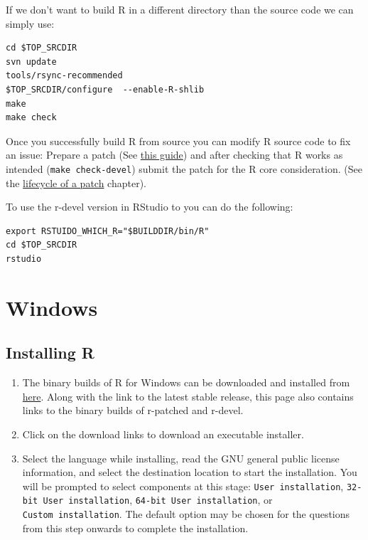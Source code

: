 \documentclass[
]{book}
\begin{document}
If we don't want to build R in a different directory than the source code we can simply use:

\begin{verbatim}
cd $TOP_SRCDIR 
svn update
tools/rsync-recommended
$TOP_SRCDIR/configure  --enable-R-shlib
make 
make check
\end{verbatim}

Once you successfully build R from source you can modify R source code to fix an issue: Prepare a patch (See \href{https://www.r-project.org/bugs.html\#how-to-submit-patches}{this guide}) and after checking that R works as intended (\texttt{make\ check-devel}) submit the patch for the R core consideration.
(See the \protect\hyperlink{FixBug}{lifecycle of a patch} chapter).

To use the r-devel version in RStudio to you can do the following:

\begin{verbatim}
export RSTUIDO_WHICH_R="$BUILDDIR/bin/R"
cd $TOP_SRCDIR
rstudio
\end{verbatim}

\hypertarget{windows-1}{%
\section{Windows}\label{windows-1}}

\hypertarget{installR}{%
\subsection{Installing R}\label{installR}}

\begin{enumerate}
\def\labelenumi{\arabic{enumi}.}
\item
  The binary builds of R for Windows can be downloaded and installed from \href{https://cran.r-project.org/bin/windows/base/}{here}.
  Along with the link to the latest stable release, this page also contains links to the binary builds of r-patched and r-devel.
\item
  Click on the download links to download an executable installer.
\item
  Select the language while installing, read the GNU general public license information, and select the destination location to start the installation.
  You will be prompted to select components at this stage: \texttt{User\ installation}, \texttt{32-bit\ User\ installation}, \texttt{64-bit\ User\ installation}, or \texttt{Custom\ installation}.
  The default option may be chosen for the questions from this step onwards to complete the installation.
\end{enumerate}
\end{document}
